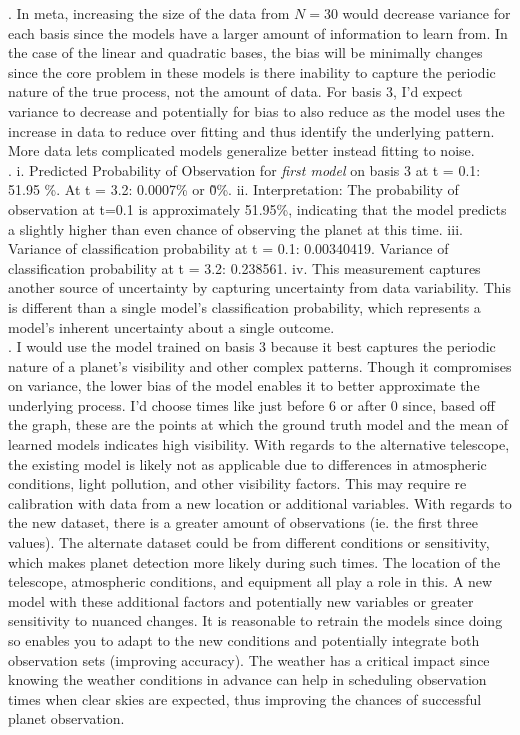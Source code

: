 \documentclass[submit]{harvardml}
\begin{document}
. In meta, increasing the size of the data from $N = 30$ would decrease variance for each basis since the models have a larger amount of information to learn from. In the case of the linear and quadratic bases, the bias will be minimally changes since the core problem in these models is there inability to capture the periodic nature of the true process, not the amount of data. For basis 3, I'd expect variance to decrease and potentially for bias to also reduce as the model uses the increase in data to reduce over fitting and thus identify the underlying pattern. More data lets complicated models generalize better instead fitting to noise. 
\\
. i. Predicted Probability of Observation for \textit{first model} on basis 3 at t = 0.1: 51.95 \%.   At t = 3.2: 0.0007\% or \~ 0\%. 
\newline \indent ii. Interpretation: The probability of observation at t=0.1 is approximately 51.95\%, indicating that the model predicts a slightly higher than even chance of observing the planet at this time. 
\newline \indent  iii. Variance of classification probability at t = 0.1: 0.00340419. Variance of classification probability at t = 3.2: 0.238561. 
\newline \indent iv. This measurement captures another source of uncertainty by capturing uncertainty from data variability. This is different than a single model's classification probability, which represents a model's inherent uncertainty about a single outcome. 
\\. I would use the model trained on basis 3 because it best captures the periodic nature of a planet's visibility and other complex patterns. Though it compromises on variance, the lower bias of the model enables it to better approximate the underlying process. I'd choose times like just before 6 or after 0 since, based off the graph, these are the points at which the ground truth model and the mean of learned models indicates high visibility. With regards to the alternative telescope, the existing model is likely not as applicable due to differences in atmospheric conditions, light pollution, and other visibility factors. This may require re calibration with data from a new location or additional variables. With regards to the new dataset, there is a greater amount of observations (ie. the first three values). The alternate dataset could be from different conditions or sensitivity, which makes planet detection more likely during such times. The location of the telescope, atmospheric conditions, and equipment all play a role in this. A new model with these additional factors and potentially new variables or greater sensitivity to nuanced changes.  It is reasonable to retrain the models since doing so enables you to adapt to the new conditions and potentially integrate both observation sets (improving accuracy). The weather has a critical impact since knowing the weather conditions in advance can help in scheduling observation times when clear skies are expected, thus improving the chances of successful planet observation.
\end{document}
